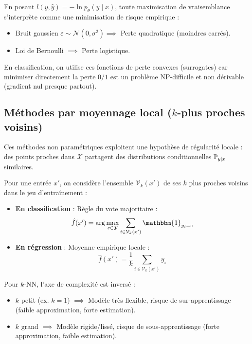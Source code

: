 \begin{remark}
    En posant $l(y, \hat{y}) = -\ln p_\theta(y \mid x)$, toute maximisation de vraisemblance s'interprète comme une minimisation de risque empirique :
    \begin{itemize}
        \item Bruit gaussien $\varepsilon \sim \mathcal{N}(0, \sigma^2) \implies$ Perte quadratique (moindres carrés).
        \item Loi de Bernoulli $\implies$ Perte logistique.
    \end{itemize}
    En classification, on utilise ces fonctions de perte convexes (surrogates) car minimiser directement la perte $0/1$ est un problème NP-difficile et non dérivable (gradient nul presque partout).
\end{remark}

\subsection{Méthodes par moyennage local ($k$-plus proches voisins)}

Ces méthodes non paramétriques exploitent une hypothèse de régularité locale : des points proches dans $\mathcal{X}$ partagent des distributions conditionnelles $\mathbb{P}_{y|x}$ similaires.

\begin{definition}
    Pour une entrée $x'$, on considère l'ensemble $\mathcal{V}_k(x')$ de ses $k$ plus proches voisins dans le jeu d'entraînement :
    \begin{itemize}
        \item \textbf{En classification} : Règle du vote majoritaire :
        \begin{equation}
            \hat{f}(x') = \arg \max_{c \in \mathcal{Y}} \sum_{i \in \mathcal{V}_k(x')} \mathbbm{1}_{y_i = c}
        \end{equation}
        \item \textbf{En régression} : Moyenne empirique locale :
        \begin{equation}
            \hat{f}(x') = \frac{1}{k} \sum_{i \in \mathcal{V}_k(x')} y_i
        \end{equation}
    \end{itemize}
\end{definition}

\begin{remark}
    Pour $k$-NN, l'axe de complexité est inversé :
    \begin{itemize}
        \item $k$ petit (ex. $k=1$) $\implies$ Modèle très flexible, risque de sur-apprentissage (faible approximation, forte estimation).
        \item $k$ grand $\implies$ Modèle rigide/lissé, risque de sous-apprentissage (forte approximation, faible estimation).
    \end{itemize}
\end{remark}

